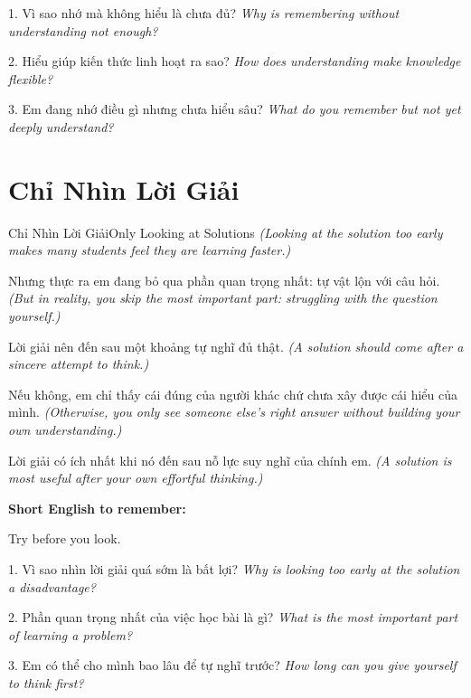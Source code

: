 \begin{tuhocnhanh}
1. Vì sao nhớ mà không hiểu là chưa đủ? \textit{Why is remembering without understanding not enough?}

2. Hiểu giúp kiến thức linh hoạt ra sao? \textit{How does understanding make knowledge flexible?}

3. Em đang nhớ điều gì nhưng chưa hiểu sâu? \textit{What do you remember but not yet deeply understand?}
\end{tuhocnhanh}
\ngancach

\section{Chỉ Nhìn Lời Giải}
\begin{truyen}{Chỉ Nhìn Lời Giải}{Only Looking at Solutions}
\textit{(Looking at the solution too early makes many students feel they are learning faster.)}

Nhưng thực ra em đang bỏ qua phần quan trọng nhất: tự vật lộn với câu hỏi.
\textit{(But in reality, you skip the most important part: struggling with the question yourself.)}

Lời giải nên đến sau một khoảng tự nghĩ đủ thật.
\textit{(A solution should come after a sincere attempt to think.)}

Nếu không, em chỉ thấy cái đúng của người khác chứ chưa xây được cái hiểu của mình.
\textit{(Otherwise, you only see someone else's right answer without building your own understanding.)}
\end{truyen}

\begin{baihoc}
Lời giải có ích nhất khi nó đến sau nỗ lực suy nghĩ của chính em.
\textit{(A solution is most useful after your own effortful thinking.)}
\end{baihoc}

\begin{ghinhoanh}
\textbf{Short English to remember:}

Try before you look.

\end{ghinhoanh}

\begin{tuhocnhanh}
1. Vì sao nhìn lời giải quá sớm là bất lợi? \textit{Why is looking too early at the solution a disadvantage?}

2. Phần quan trọng nhất của việc học bài là gì? \textit{What is the most important part of learning a problem?}

3. Em có thể cho mình bao lâu để tự nghĩ trước? \textit{How long can you give yourself to think first?}
\end{tuhocnhanh}
\ngancach

